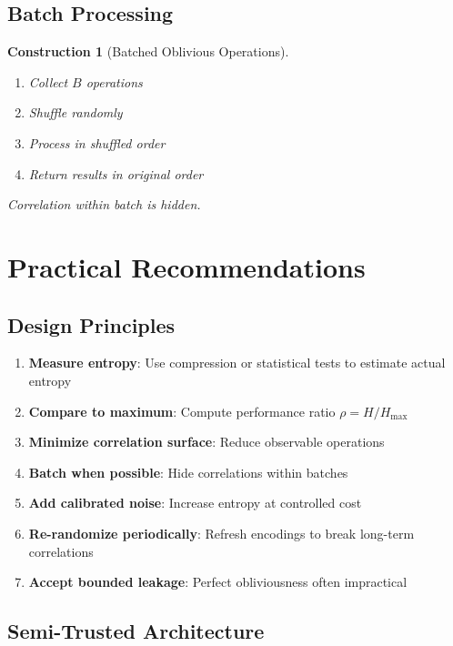 \documentclass[11pt,final]{article}
\newtheorem{construction}[theorem]{Construction}
\begin{document}
\subsection{Batch Processing}

\begin{construction}[Batched Oblivious Operations]
\begin{enumerate}
    \item Collect $B$ operations
    \item Shuffle randomly
    \item Process in shuffled order
    \item Return results in original order
\end{enumerate}
Correlation within batch is hidden.
\end{construction}

\section{Practical Recommendations}

\subsection{Design Principles}

\begin{enumerate}
    \item \textbf{Measure entropy}: Use compression or statistical tests to estimate actual entropy
    \item \textbf{Compare to maximum}: Compute performance ratio $\rho = H/H_{\max}$
    \item \textbf{Minimize correlation surface}: Reduce observable operations
    \item \textbf{Batch when possible}: Hide correlations within batches
    \item \textbf{Add calibrated noise}: Increase entropy at controlled cost
    \item \textbf{Re-randomize periodically}: Refresh encodings to break long-term correlations
    \item \textbf{Accept bounded leakage}: Perfect obliviousness often impractical
\end{enumerate}

\subsection{Semi-Trusted Architecture}
\end{document}

